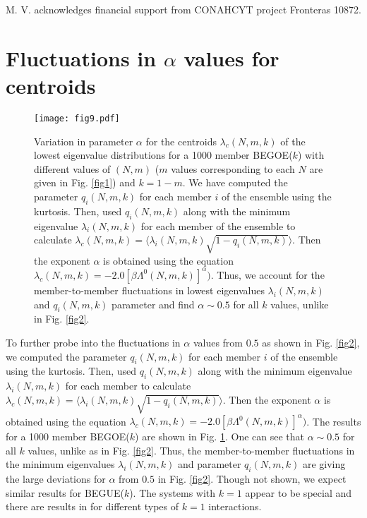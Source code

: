 M. V.  acknowledges financial support from CONAHCYT project Fronteras 10872.  

\onecolumngrid
\setcounter{figure}{0}
\renewcommand{\thefigure}{A\arabic{figure}}

\appendix*
\section{Fluctuations in $\alpha$ values for centroids}
\label{app1}

\begin{figure}[tbh]
	\begin{center}
		\texttt{[image: fig9.pdf]}
	\end{center}
	\caption{Variation in parameter $\alpha$ for the centroids $\lambda_c(N,m,k)$ of the lowest eigenvalue distributions for a 1000 member BEGOE($k$) with different values of $(N,m)$ ($m$ values corresponding to each $N$ are given in Fig. \ref{fig1}) and $k = 1-m$.  We have computed the parameter $q_i(N, m,k)$ for each member $i$ of the ensemble using the kurtosis. Then, used $q_i(N, m,k)$ along with the minimum eigenvalue $\lambda_i(N,m,k)$ for each member of the ensemble to calculate $\lambda_c(N,m,k) = \langle \lambda_i(N,m,k) \sqrt{1-q_i(N,m,k)} \rangle$.  Then the exponent $\alpha$ is obtained using the equation $\lambda_c(N,m,k) = -2.0 {[\beta \Lambda^{0}(N,m,k)]}^{\alpha})$.  Thus, we account for the member-to-member fluctuations in lowest eigenvalues $\lambda_i(N,m,k)$ and $q_i(N,m,k)$ parameter and find $\alpha \sim 0.5$ for all $k$ values, unlike in Fig. \ref{fig2}.}
		\label{fig9}
\end{figure}

To further probe into the fluctuations in $\alpha$ values from $0.5$ as shown in Fig. \ref{fig2}, we computed the parameter $q_i(N, m,k)$ for each member $i$ of the ensemble using the kurtosis. Then, used $q_i(N, m,k)$ along with the minimum eigenvalue $\lambda_i(N,m,k)$ for each member to calculate $\lambda_c(N,m,k) = \langle \lambda_i(N,m,k) \sqrt{1-q_i(N,m,k)} \rangle$.  Then the exponent $\alpha$ is obtained using the equation $\lambda_c(N,m,k) = -2.0 {[\beta \Lambda^{0}(N,m,k)]}^{\alpha})$.  The results for a 1000 member BEGOE($k$) are shown in Fig. \ref{fig9}.  One can see that $\alpha \sim 0.5$ for all $k$ values, unlike as in Fig. \ref{fig2}. Thus, the member-to-member fluctuations in the minimum eigenvalues $\lambda_i(N,m,k)$  and parameter $q_i(N,m,k)$ are giving the large deviations for $\alpha$ from $0.5$ in Fig. \ref{fig2}.  Though not shown, we expect similar results for BEGUE($k$).  The systems with $k=1$ appear to be special and there are results in \cite{Majumdar-NIP} for different types of $k=1$ interactions. 

